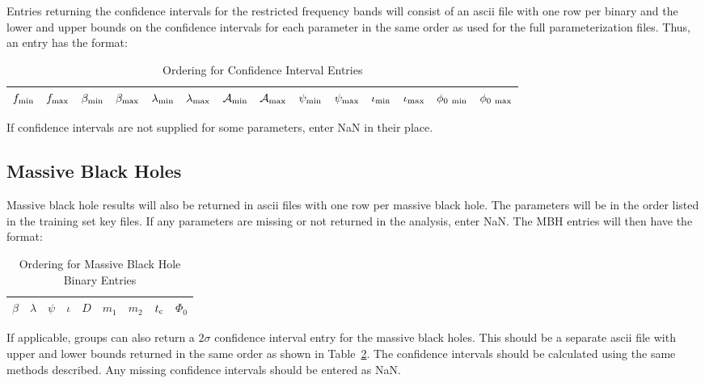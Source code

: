 \documentclass[11pt]{article}
\begin{document}
Entries returning the confidence intervals for the restricted frequency bands will consist of an ascii file with one row per binary and the lower and upper bounds on the confidence intervals for each parameter in the same order as used for the full parameterization files. Thus, an entry has the format:
\begin{table}[h]
	\centering
	\caption{Ordering for Confidence Interval Entries}
	\begin{tabular}{cccccccccccccc}
	\hline
	$f_{\rm min}$ & $f_{\rm max}$ & $\beta_{\rm min}$ & $\beta_{\rm max}$ & $\lambda_{\rm min}$ & $\lambda_{\rm max}$ & $\mathcal{A}_{\rm min}$ & $\mathcal{A}_{\rm max}$ & $\psi_{\rm min}$ & $\psi_{\rm max}$ & $\iota_{\rm min}$ & $\iota_{\rm max}$ & $\phi_{0~{\rm min}}$ & $\phi_{0~{\rm max}}$ \\
	\hline
	\end{tabular}
	\label{galacticconfidence}
\end{table}
If confidence intervals are not supplied for some parameters, enter NaN in their place.

\subsection{Massive Black Holes}
Massive black hole results will also be returned in ascii files with one row per massive black hole. The parameters will be in the order listed in the training set key files. If any parameters are missing or not returned in the analysis, enter NaN. The MBH entries will then have the format:
\begin{table}[h]
	\centering
	\caption{Ordering for Massive Black Hole Binary Entries}
	\begin{tabular}{ccccccccc}
		\hline
		$\beta$ & $\lambda$ & $\psi$ & $\iota$ & $D$ & $m_1$ & $m_2$ & $t_{\rm c}$ & $\Phi_0$ \\
		\hline
	\end{tabular}
	\label{mbhentries}
\end{table}

If applicable, groups can also return a $2\sigma$ confidence interval entry for the massive black holes. This should be a separate ascii file with upper and lower bounds returned in the same order as shown in Table~\ref{mbhentries}. The confidence intervals should be calculated using the same methods described. Any missing confidence intervals should be entered as NaN.
\end{document}
